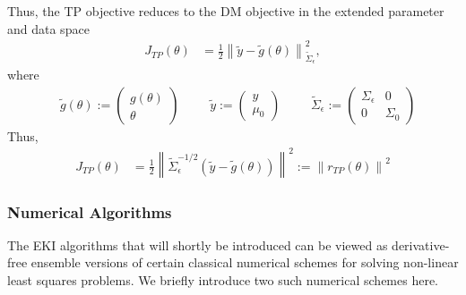 \documentclass[12pt]{article}
\newcommand*{\norm}[1]{\left\lVert#1\right\rVert}
\begin{document}
Thus, the TP objective reduces to the DM objective in the extended parameter and data space
\begin{align*}
J_{TP}(\theta) &= \frac{1}{2} \norm{\tilde{y} - \tilde{g}(\theta)}^2_{\tilde{\Sigma}_{\epsilon}},
\end{align*}
where 
\begin{align*}
&\tilde{g}(\theta) := \begin{pmatrix} g(\theta) \\ \theta \end{pmatrix} && &\tilde{y} := \begin{pmatrix} y \\ \mu_0 \end{pmatrix} &&&\tilde{\Sigma}_{\epsilon} := \begin{pmatrix} \Sigma_\epsilon & 0 \\ 0 & \Sigma_0 \end{pmatrix} 
\end{align*}
Thus, 
\begin{align*}
J_{TP}(\theta) &= \frac{1}{2} \norm{\tilde{\Sigma}^{-1/2}_{\epsilon} (\tilde{y} - \tilde{g}(\theta))}^2 := \norm{r_{TP}(\theta)}^2
\end{align*}

\subsubsection{Numerical Algorithms}
The EKI algorithms that will shortly be introduced can be viewed as derivative-free ensemble versions of certain classical numerical schemes for solving non-linear least squares problems. We briefly 
introduce two such numerical schemes here.  
\end{document}
